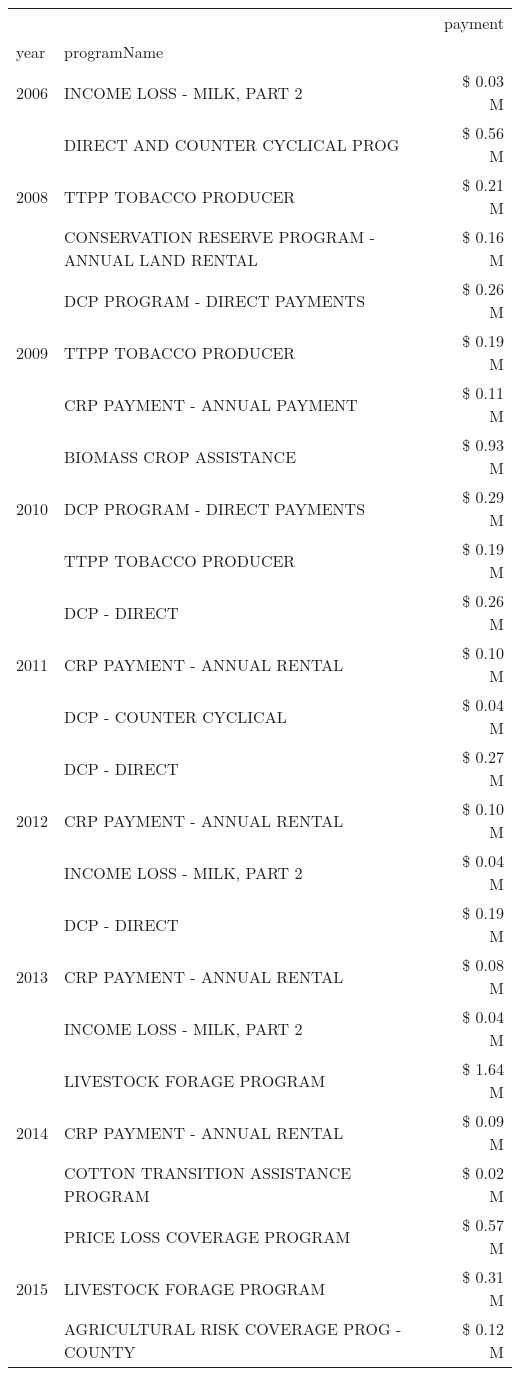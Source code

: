 \begin{tabular}{llr}
\toprule
 &  & payment \\
year & programName &  \\
\midrule
2006 & INCOME LOSS - MILK, PART 2 & \$ 0.03 M \\
\cline{1-3}
\multirow[t]{3}{*}{2008} & DIRECT AND COUNTER CYCLICAL PROG & \$ 0.56 M \\
 & TTPP TOBACCO PRODUCER & \$ 0.21 M \\
 & CONSERVATION RESERVE PROGRAM - ANNUAL LAND RENTAL & \$ 0.16 M \\
\cline{1-3}
\multirow[t]{3}{*}{2009} & DCP PROGRAM - DIRECT PAYMENTS & \$ 0.26 M \\
 & TTPP TOBACCO PRODUCER & \$ 0.19 M \\
 & CRP PAYMENT - ANNUAL PAYMENT & \$ 0.11 M \\
\cline{1-3}
\multirow[t]{3}{*}{2010} & BIOMASS CROP ASSISTANCE & \$ 0.93 M \\
 & DCP PROGRAM - DIRECT PAYMENTS & \$ 0.29 M \\
 & TTPP TOBACCO PRODUCER & \$ 0.19 M \\
\cline{1-3}
\multirow[t]{3}{*}{2011} & DCP - DIRECT & \$ 0.26 M \\
 & CRP PAYMENT - ANNUAL RENTAL & \$ 0.10 M \\
 & DCP - COUNTER CYCLICAL & \$ 0.04 M \\
\cline{1-3}
\multirow[t]{3}{*}{2012} & DCP - DIRECT & \$ 0.27 M \\
 & CRP PAYMENT - ANNUAL RENTAL & \$ 0.10 M \\
 & INCOME LOSS - MILK, PART 2 & \$ 0.04 M \\
\cline{1-3}
\multirow[t]{3}{*}{2013} & DCP - DIRECT & \$ 0.19 M \\
 & CRP PAYMENT - ANNUAL RENTAL & \$ 0.08 M \\
 & INCOME LOSS - MILK, PART 2 & \$ 0.04 M \\
\cline{1-3}
\multirow[t]{3}{*}{2014} & LIVESTOCK FORAGE PROGRAM & \$ 1.64 M \\
 & CRP PAYMENT - ANNUAL RENTAL & \$ 0.09 M \\
 & COTTON TRANSITION ASSISTANCE PROGRAM & \$ 0.02 M \\
\cline{1-3}
\multirow[t]{3}{*}{2015} & PRICE LOSS COVERAGE PROGRAM & \$ 0.57 M \\
 & LIVESTOCK FORAGE PROGRAM & \$ 0.31 M \\
 & AGRICULTURAL RISK COVERAGE PROG - COUNTY & \$ 0.12 M \\

\end{tabular}
